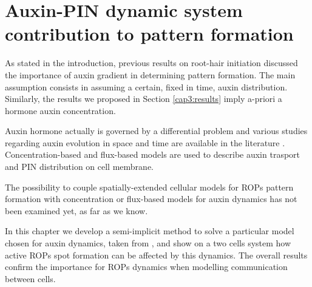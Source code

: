 \chapter{Auxin-PIN dynamic system contribution to pattern formation}\label{cap:4}
As stated in the introduction, previous results on root-hair initiation \cite{intra2, intra1_R, phdthesis:victor} discussed the importance of auxin gradient in determining pattern formation. The main assumption consists in assuming a certain, fixed in time, auxin distribution. Similarly, the results we proposed in Section \ref{cap3:results} imply a-priori a hormone auxin concentration.

Auxin hormone actually is governed by a differential problem and various studies regarding auxin evolution in space and time are available in the literature \cite{plant:Alim, plant:Farcot, plant:Mironova}. Concentration-based and flux-based models are used to describe auxin trasport and PIN distribution on cell membrane.

The possibility to couple spatially-extended cellular models for ROPs pattern formation with concentration or flux-based models for auxin dynamics has not been examined yet, as far as we know.

In this chapter we develop a semi-implicit method to solve a particular model chosen for auxin dynamics, taken from \cite{plant:Farcot}, and show on a two cells system how active ROPs spot formation can be affected by this dynamics. The overall results confirm the importance for ROPs dynamics when modelling communication between cells.



